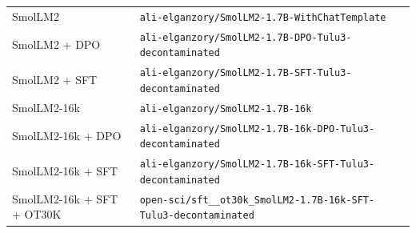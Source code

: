 \begin{table}[ht]
\begin{tabular}{lp{10cm}}
SmolLM2 & \texttt{ali-\allowbreak{}elganzory/\allowbreak{}SmolLM2-\allowbreak{}1.7B-\allowbreak{}WithChatTemplate} \\
SmolLM2 + DPO & \texttt{ali-\allowbreak{}elganzory/\allowbreak{}SmolLM2-\allowbreak{}1.7B-\allowbreak{}DPO-\allowbreak{}Tulu3-\allowbreak{}decontaminated} \\
SmolLM2 + SFT & \texttt{ali-\allowbreak{}elganzory/\allowbreak{}SmolLM2-\allowbreak{}1.7B-\allowbreak{}SFT-\allowbreak{}Tulu3-\allowbreak{}decontaminated} \\
SmolLM2-16k & \texttt{ali-\allowbreak{}elganzory/\allowbreak{}SmolLM2-\allowbreak{}1.7B-\allowbreak{}16k} \\
SmolLM2-16k + DPO & \texttt{ali-\allowbreak{}elganzory/\allowbreak{}SmolLM2-\allowbreak{}1.7B-\allowbreak{}16k-\allowbreak{}DPO-\allowbreak{}Tulu3-\allowbreak{}decontaminated} \\
SmolLM2-16k + SFT & \texttt{ali-\allowbreak{}elganzory/\allowbreak{}SmolLM2-\allowbreak{}1.7B-\allowbreak{}16k-\allowbreak{}SFT-\allowbreak{}Tulu3-\allowbreak{}decontaminated} \\
SmolLM2-16k + SFT + OT30K & \texttt{open-\allowbreak{}sci/\allowbreak{}sft\_\_ot30k\_SmolLM2-\allowbreak{}1.7B-\allowbreak{}16k-\allowbreak{}SFT-\allowbreak{}Tulu3-\allowbreak{}decontaminated} \\
\bottomrule
\end{tabular}
\end{table}
